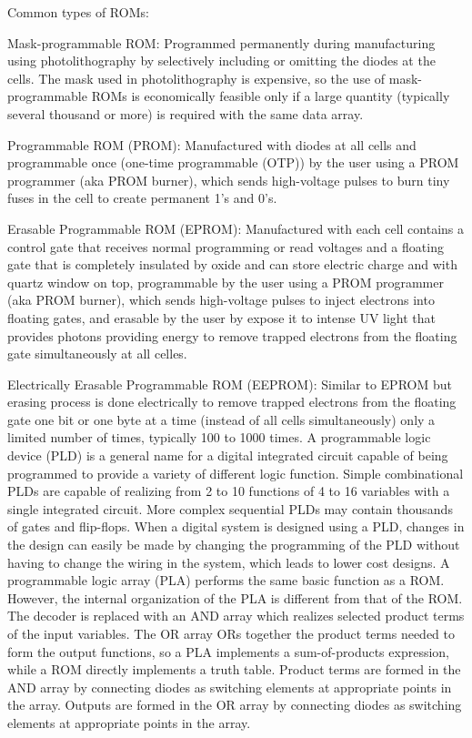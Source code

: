 \documentclass[a4paper,12pt]{report}
\begin{document}
Common types of ROMs:
\bit
\item Mask-programmable ROM: Programmed permanently during manufacturing using photolithography by selectively including or omitting the diodes at the cells. The mask used in photolithography is expensive, so the use of mask-programmable ROMs is economically feasible only if a large quantity (typically several thousand or more) is required with the same data array.
\item Programmable ROM (PROM): Manufactured with diodes at all cells and programmable once (one-time programmable (OTP)) by the user using a PROM programmer (aka PROM burner), which sends high-voltage pulses to burn tiny fuses in the cell to create permanent 1's and 0's.
\item Erasable Programmable ROM (EPROM): Manufactured with each cell contains a control gate that receives normal programming or read voltages and a floating gate that is completely insulated by oxide and can store electric charge and with quartz window on top, programmable by the user using a PROM programmer (aka PROM burner), which sends high-voltage pulses to inject electrons into floating gates, and erasable by the user by expose it to intense UV light that provides photons providing energy to remove trapped electrons from the floating gate simultaneously at all celles.
\item Electrically Erasable Programmable ROM (EEPROM): Similar to EPROM but erasing process is done electrically to remove trapped electrons from the floating gate one bit or one byte at a time (instead of all cells simultaneously) only a limited number of times, typically 100 to 1000 times.
\eit
{}
A programmable logic device (PLD) is a general name for a digital integrated circuit capable of being programmed to provide a variety of different logic function. Simple combinational PLDs are capable of realizing from 2 to 10 functions of 4 to 16 variables with a single integrated circuit. More complex sequential PLDs may contain thousands of gates and flip-flops. When a digital system is designed using a PLD, changes in the design can easily be made by changing the programming of the PLD without having to change the wiring in the system, which leads to lower cost designs.
A programmable logic array (PLA) performs the same basic function as a ROM. However, the internal organization of the PLA is different from that of the ROM. The decoder is replaced with an AND array which realizes selected product terms of the input variables. The OR array ORs together the product terms needed to form the output functions, so a PLA implements a sum-of-products expression, while a ROM directly implements a truth table. Product terms are formed in the AND array by connecting diodes as switching elements at appropriate points in the array. Outputs are formed in the OR array by connecting diodes as switching elements at appropriate points in the array.
\end{document}
